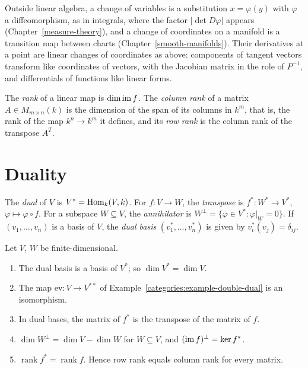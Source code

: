 \begin{remark}
Outside linear algebra, a change of variables is a substitution $x = \varphi(y)$ with $\varphi$ a diffeomorphism, as in integrals, where the factor $|\det D\varphi|$ appears
(Chapter~\ref{measure-theory}), and a change of coordinates on a manifold is a transition map between charts (Chapter~\ref{smooth-manifolds}). Their derivatives at a point are linear changes of
coordinates as above: components of tangent vectors transform like coordinates of vectors, with the Jacobian matrix in the role of $P^{-1}$, and differentials of functions like linear forms.
\end{remark}
\begin{definition}\label{linear-algebra:definition-rank}
The \emph{rank} of a linear map is $\dim \operatorname{im} f$. The \emph{column rank} of a matrix
$A \in M_{m \times n}(k)$ is the dimension of the span of its columns in $k^m$, that is, the rank of
the map $k^n \to k^m$ it defines, and its \emph{row rank} is the column rank of the transpose
$A^T$.
\end{definition}

\section{Duality}\label{linear-algebra:section-duality}

\begin{definition}\label{linear-algebra:definition-dual}
The \emph{dual} of $V$ is $V^* = \operatorname{Hom}_k(V, k)$. For $f \colon V \to W$, the \emph{transpose} is
$f^* \colon W^* \to V^*$, $\varphi \mapsto \varphi \circ f$. For a subspace $W \subseteq V$, the \emph{annihilator}
is $W^\perp = \{\varphi \in V^* : \varphi|_W = 0\}$. If $(v_1, \ldots, v_n)$ is a basis of $V$, the \emph{dual
basis} $(v_1^*, \ldots, v_n^*)$ is given by $v_i^*(v_j) = \delta_{ij}$.
\end{definition}

\begin{proposition}\label{linear-algebra:proposition-duality}
Let $V$, $W$ be finite-dimensional.
\begin{enumerate}
\item The dual basis is a basis of $V^*$; so $\dim V^* = \dim V$.
\item The map $\mathrm{ev} \colon V \to V^{**}$ of Example~\ref{categories:example-double-dual} is an
isomorphism.
\item In dual bases, the matrix of $f^*$ is the transpose of the matrix of $f$.
\item $\dim W^\perp = \dim V - \dim W$ for $W \subseteq V$, and $(\operatorname{im} f)^\perp = \ker f^*$.
\item $\operatorname{rank} f^* = \operatorname{rank} f$. Hence row rank equals column rank for every matrix.
\end{enumerate}
\end{proposition}

